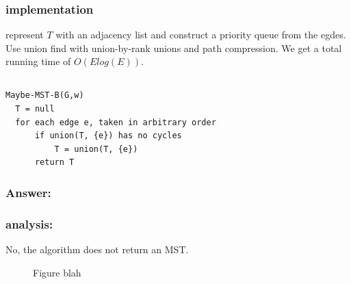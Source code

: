 \documentclass[titlepage]{article}
\theoremstyle{definition}
\begin{document}
    \subsubsection{implementation}
      represent $T$ with an adjacency list and construct a priority queue from
      the egdes. Use union find with union-by-rank unions and path compression.
      We get a total running time of $O\left(E log(E)\right)$.


\subsection{}
\begin{lstlisting}
Maybe-MST-B(G,w)
  T = null
  for each edge e, taken in arbitrary order
	  if union(T, {e}) has no cycles
		  T = union(T, {e})
	  return T
\end{lstlisting}
  \subsubsection{Answer: }
  \subsubsection{analysis: }
    No, the algorithm does not return an MST. 
      
    \usetikzlibrary{arrows}
    \begin{figure}
      \begin{center}
      \end{center}
    \caption{Figure blah}
    \label{fig:mst}
    \end{figure}
\end{document}
